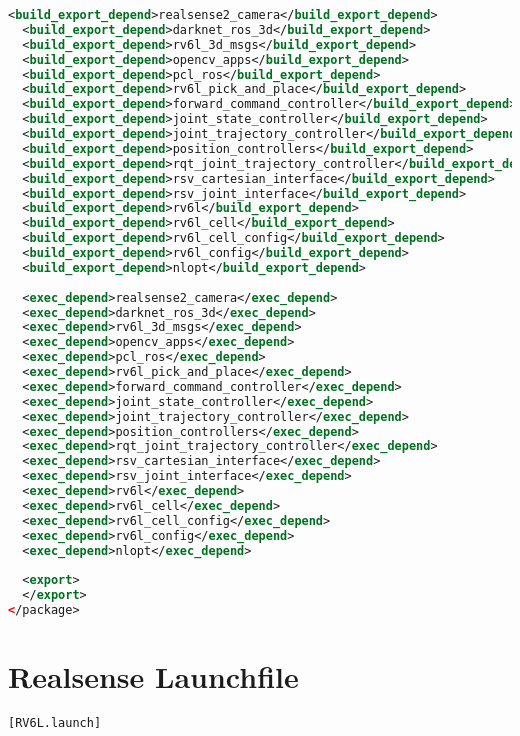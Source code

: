 \begin{lstlisting}[language=xml]
  <build_export_depend>realsense2_camera</build_export_depend>
  <build_export_depend>darknet_ros_3d</build_export_depend>
  <build_export_depend>rv6l_3d_msgs</build_export_depend>
  <build_export_depend>opencv_apps</build_export_depend>
  <build_export_depend>pcl_ros</build_export_depend>
  <build_export_depend>rv6l_pick_and_place</build_export_depend>
  <build_export_depend>forward_command_controller</build_export_depend>
  <build_export_depend>joint_state_controller</build_export_depend>
  <build_export_depend>joint_trajectory_controller</build_export_depend>
  <build_export_depend>position_controllers</build_export_depend>
  <build_export_depend>rqt_joint_trajectory_controller</build_export_depend>
  <build_export_depend>rsv_cartesian_interface</build_export_depend>
  <build_export_depend>rsv_joint_interface</build_export_depend>
  <build_export_depend>rv6l</build_export_depend>
  <build_export_depend>rv6l_cell</build_export_depend>
  <build_export_depend>rv6l_cell_config</build_export_depend>
  <build_export_depend>rv6l_config</build_export_depend>
  <build_export_depend>nlopt</build_export_depend>
  
  <exec_depend>realsense2_camera</exec_depend>
  <exec_depend>darknet_ros_3d</exec_depend>
  <exec_depend>rv6l_3d_msgs</exec_depend>
  <exec_depend>opencv_apps</exec_depend>
  <exec_depend>pcl_ros</exec_depend>
  <exec_depend>rv6l_pick_and_place</exec_depend>
  <exec_depend>forward_command_controller</exec_depend>
  <exec_depend>joint_state_controller</exec_depend>
  <exec_depend>joint_trajectory_controller</exec_depend>
  <exec_depend>position_controllers</exec_depend>
  <exec_depend>rqt_joint_trajectory_controller</exec_depend>
  <exec_depend>rsv_cartesian_interface</exec_depend>
  <exec_depend>rsv_joint_interface</exec_depend>
  <exec_depend>rv6l</exec_depend>
  <exec_depend>rv6l_cell</exec_depend>
  <exec_depend>rv6l_cell_config</exec_depend>
  <exec_depend>rv6l_config</exec_depend>
  <exec_depend>nlopt</exec_depend>
  
  <export>
  </export>
</package>
\end{lstlisting}

\newpage\section{Realsense Launchfile} \label{sec:realsense}

\lstinline{[RV6L.launch]}

